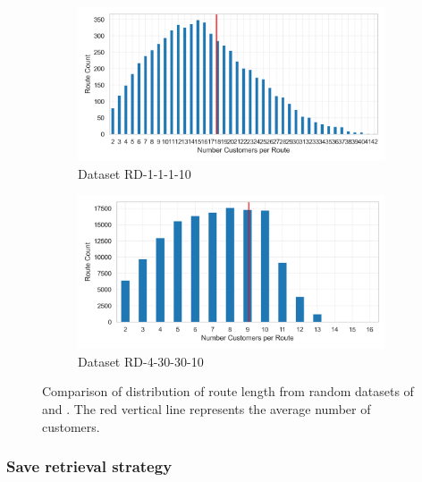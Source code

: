 \begin{figure}[ht]
    \centering
    \begin{subfigure}[t]{.5\textwidth}
        \centering
        \includegraphics[width=\linewidth]{pictures/dataset_structure/no_cust_plot_RandomData_1_1_1_10.png}
        \caption{Dataset RD-1-1-1-10}
        \label{fig:ds-a-krebs_lop}
    \end{subfigure}%
    \begin{subfigure}[t]{.5\textwidth}
        \centering
        \includegraphics[width=\linewidth]{pictures/dataset_structure/no_cust_plot_RandomData_4_30_30_10.png}
        \caption{Dataset RD-4-30-30-10}
        \label{fig:ds-b-krebs_luf}
    \end{subfigure}
    \caption[Comparison of distribution of route length from random datasets of \krebsADataSetText and \gendreauDataSet.]{Comparison of distribution of route length from random datasets of \krebsADataSetText and \gendreauDataSet. The red vertical line represents the average
        number of customers.}
    \label{fig:route_cust_no_krebs_new}
\end{figure}

\subsubsection{Save retrieval strategy}

